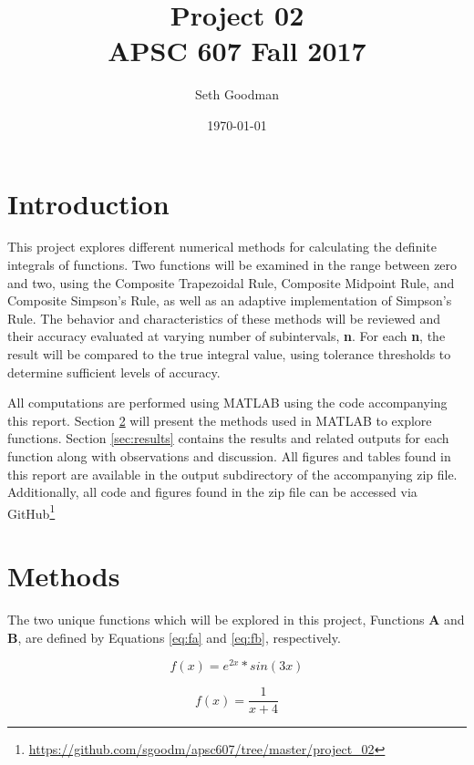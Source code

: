 \documentclass{article}
\title{
	Project 02 \\
	\bigskip
	\normalsize APSC 607 Fall 2017
}
\author{Seth Goodman}
\date{\today}
\begin{document}
\maketitle



\section{Introduction}
\label{sec:introduction}

This project explores different numerical methods for calculating the definite integrals of functions. Two functions will be examined in the range between zero and two, using the Composite Trapezoidal Rule, Composite Midpoint Rule, and Composite Simpson’s Rule, as well as an adaptive implementation of Simpson’s Rule. The behavior and characteristics of these methods will be reviewed and their accuracy evaluated at varying number of subintervals, \textbf{n}. For each \textbf{n}, the result will be compared to the true integral value, using tolerance thresholds to determine sufficient levels of accuracy. 
  		  
All computations are performed using MATLAB using the code accompanying this report. Section \ref{sec:methods} will present the methods used in MATLAB to explore functions. Section \ref{sec:results} contains the results and related outputs for each function along with observations and discussion. All figures and tables found in this report are available in the output subdirectory of the accompanying zip file. Additionally, all code and figures found in the zip file can be accessed via GitHub\footnote{\url{https://github.com/sgoodm/apsc607/tree/master/project_02}}

\newpage
\section{Methods}
\label{sec:methods}

The two unique functions which will be explored in this project, Functions \textbf{A} and \textbf{B}, are defined by Equations \ref{eq:fa} and \ref{eq:fb}, respectively.

\begin{center}
    \centering
    \begin{minipage}{0.5\textwidth}
        \centering
        \begin{equation}
		f(x) = e^{2x} * sin(3x)
		\label{eq:fa}
		\end{equation}
    \end{minipage}\hfill
    \begin{minipage}{0.5\textwidth}
        \centering
        \begin{equation}
		f(x) = \frac{1}{x+4}
		\label{eq:fb}
		\end{equation}
    \end{minipage}
\end{center}
\end{document}
